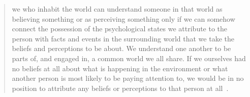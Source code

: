 \documentclass[11pt]{article}
\newenvironment{squote}{\begin{quote}\begin{singlespace}}{\end{singlespace}\end{quote}}
\begin{document}
\begin{spacing}{1.5}
\begin{squote}
we who inhabit the world can understand someone in that world as believing something or as perceiving something only if we can somehow connect the possession of the psychological states we attribute to the person with facts and events in the surrounding world that we take the beliefs and perceptions to be about. We understand one another to be parts of, and engaged in, a common world we all share. If we ourselves had no beliefs at all about what is happening in the environment or what another person is most likely to be paying attention to, we would be in no position to attribute any beliefs or perceptions to that person at all~\citep[150--151]{stroud2000a}.
\end{squote}

\ifstandalone
\end{spacing}


\fi
\end{document}
